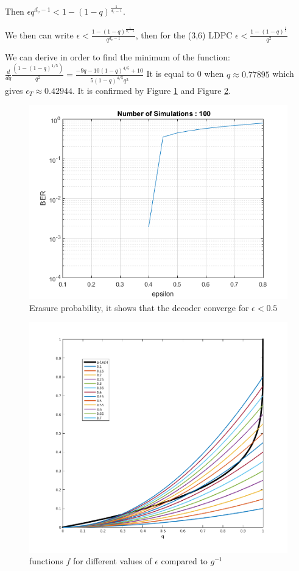\documentclass[a4paper]{article}
\begin{document}
Then $ \epsilon q^{d_v-1}<1-(1-q)^{\frac{1}{d_c-1}}$. 

We then can write $ \epsilon<\frac{1-(1-q)^{\frac{1}{d_c-1}}}{q^{d_v-1}}$, then for the (3,6) LDPC  $ \epsilon<\frac{1-(1-q)^{\frac{1}{5}}}{q^{2}}$

We can derive in order to find the minimum of the function: $\frac{d}{dq} \frac{(1-(1-q)^{1/5})}{q^2} = \frac{-9 q-10 (1-q)^{4/5}+10}{5 (1-q)^{4/5} q^3}$
It is equal to 0 when $q\approx 0.77895$ which gives $ \epsilon_T \approx 0.42944 $. It is confirmed by Figure \ref{bec} and Figure \ref{fandg}.

\begin{figure}[ht!]
\centering
\begin{center}
\includegraphics[scale=0.70]{bec.png}
\caption{Erasure probability, it shows that the decoder converge for $\epsilon < 0.5$}
\label{bec}
\end{center}
\end{figure}

\begin{figure}[ht!]
\centering
\begin{center}
\includegraphics[scale=0.60]{fandg.png}
\caption{functions $f$ for different values of $\epsilon$ compared to $g^{-1}$}
\label{fandg}
\end{center}
\end{figure}
\end{document}
